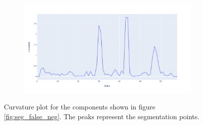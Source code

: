 \begin{figure}
	\centering
	\begin{subfigure}{0.9\textwidth}
		\centering
		\includegraphics[scale=0.5]{./img/seg_curvature_plot}
	\end{subfigure}
	\caption{Curvature plot for the components shown in figure \ref{fig:seg_false_neg}. The peaks represent the segmentation points.}
	\label{fig:seg_curvature}
\end{figure}

